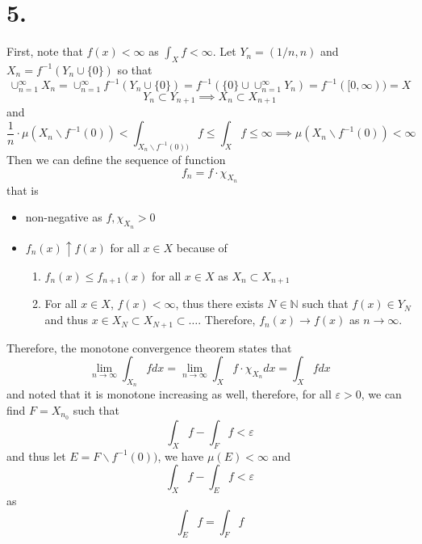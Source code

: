 \documentclass[11pt]{article}
\theoremstyle{mystyle}
\theoremstyle{definition}
\begin{document}
\section*{5.}
First, note that $f(x) < \infty$ as $\int_X f < \infty$. Let $Y_n = (1/n, n)$ and $X_n = f^{-1}(Y_n \cup \{0\})$ so that 
\[
  \cup_{n=1}^\infty X_n = \cup_{n=1}^\infty f^{-1}(Y_n \cup \{0\}) = f^{-1}(\{0\} \cup \cup_{n=1}^\infty Y_n ) = f^{-1}([0,\infty)) = X 
\]  
\[
  Y_n \subset Y_{n+1} \implies X_n \subset X_{n+1}
\]
and 
\[
  \displaystyle\frac{1}{n} \cdot \mu(X_n \backslash f^{-1}(0)) < \int_{X_n \backslash f^{-1}(0))} f \le \int_X f  \le \infty \implies \mu(X_n \backslash f^{-1}(0)) < \infty 
\]
Then we can define the sequence of function 
\[
  f_n = f \cdot \chi_{X_n}
\]
that is
\begin{itemize}
  \item non-negative as $f, \chi_{X_n} > 0$ 
  \item $f_n(x) \uparrow f(x)$ for all $x \in X$ because of 
    \begin{enumerate}
      \item $f_n(x) \le f_{n+1}(x)$ for all $x \in X$ as $X_n \subset X_{n+1}$ 
      \item For all $x \in X$, $f(x) < \infty$, thus there exists $N \in \mathbb{N}$ such that $f(x) \in Y_N$ and thus $x \in X_N \subset X_{N+1} \subset \hdots $. Therefore, $f_n(x) \to f(x)$ as $n \to \infty$. 
    \end{enumerate}
\end{itemize}
Therefore, the monotone convergence theorem states that 
\[
  \lim_{n \to \infty} \int_{X_n} f dx = \lim_{n \to \infty} \int_X f \cdot \chi_{X_n} dx = \int_X f dx
\]
and noted that it is monotone increasing as well, therefore, for all $\varepsilon > 0$, we can find $F = X_{n_0}$ such that  
\[
  \int_X f - \int_F f < \varepsilon
\]
and thus let $E = F \backslash f^{-1}(0))$, we have $\mu(E) < \infty$ and 
\[
  \int_X f - \int_E f < \varepsilon
\]
as 
\[
  \int_E f = \int_F f
\]
\end{document}
